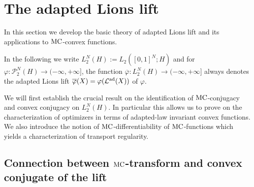 \documentclass[a4paper]{amsart}
\numberwithin{theorem}{section}
\theoremstyle{definition}
\newcommand{\law}{\mathcal{L}}
\newcommand{\Pc}{\mathcal P}
\renewcommand{\H}{H}
\renewcommand{\phi}{\varphi}
\newcommand{\mc}{\textup{MC}}
\newcommand{\MC}{\textup{MC}}
\newcommand{\lawad}{\law^{\textup{ad}}}
\begin{document}
\section{The adapted Lions lift}\label{sec:MC_cx_ad}

In this section we develop the basic theory of adapted Lions lift and its applications to $\MC$-convex functions. 
\begin{tcolorbox}
In the following we write $L_2^N(H):= L_2([0,1]^N; H)$  and 
for  $\phi : \Pc_2^N(\H) \to (-\infty, +\infty]$, the function $\overline{\phi} : L_2^N(H) \to (-\infty, +\infty]$  always denotes the adapted Lions lift $\overline\phi(X)= \phi(\lawad(X)) $  of $\phi$. %
\end{tcolorbox}
We will first establish the crucial  result  on the identification of $\MC$-conjugacy and convex conjugacy on $L_2^N(H)$. In  particular this allows us to prove  on the characterization of optimizers in terms of adapted-law invariant convex functions. We also introduce the notion of $\mc$-differentiability of $\mc$-functions which yields a characterization of transport regularity. 


\subsection{Connection between $\mc$-transform and convex conjugate of the lift}
\end{document}
